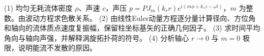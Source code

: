(1) 均匀无耗流体密度 \(\rho\)、声速 \(c\)，声压 \(p=PJ_m(k_rr)e^{i(m\phi+k_zz-\omega t)}\)，\(m\) 为整数。由波动方程求色散关系。
(2) 由线性Euler动量方程逐分量计算径向、方位角和轴向的流体质点速度复振幅，保留柱坐标基矢的正确几何因子。
(3) 求时间平均角向与轴向声强，并解释涡旋拓扑荷的符号。
(4) 分析轴心 \(r\to0\) 与 \(m=0\) 极限，说明能流不发散的原因。
